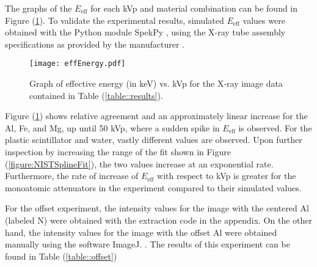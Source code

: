 \begin{table}[H]
    \small
    \noindent\makebox[\textwidth]{%
    
    }
    \caption{The results for each non-saturated (intensities not equal to 0 or 1) X-ray image for the composition experiment.}
    \label{table::results}
\end{table}



The graphs of the $E_{\text{eff}}$ for each kVp and material combination can be found in Figure (\ref{figure::results}). To validate the experimental results, simulated $E_{\text{eff}}$ values were obtained with the Python module SpekPy \cite{SpekPy}, using the X-ray tube assembly specifications as provided by the manufacturer \cite{CArm}.


\begin{figure}[H]
    \centering
    \texttt{[image: effEnergy.pdf]}
    \caption{Graph of effective energy (in keV) vs. kVp for the X-ray image data contained in Table (\ref{table::results}).}
    \label{figure::results}
\end{figure}

Figure (\ref{figure::results}) shows relative agreement and an approximately linear increase for the Al, Fe, and Mg, up until 50 kVp, where a sudden spike in $E_{\text{eff}}$ is observed. For the plastic scintillator and water, vastly different values are observed. Upon further inspection by increasing the range of the fit shown in Figure (\ref{figure:NISTSplineFit}), the two values increase at an exponential rate. Furthermore, the rate of increase of $E_{\text{eff}}$ with respect to kVp is greater for the monoatomic attenuators in the experiment compared to their simulated values.

For the offset experiment, the intensity values for the image with the centered Al (labeled N) were obtained with the extraction code in the appendix. On the other hand, the intensity values for the image with the offset Al were obtained manually using the software ImageJ. \cite{ImageJ}. The results of this experiment can be found in Table (\ref{table::offset})


\begin{table}[H]
    \small
    \noindent\makebox[\textwidth]{%
    
    }
    \caption{The results of X-ray images of a centered and offset Al (labeled N) at 40 kVp for use in the offset experiment.}
    \label{table::offset}
\end{table}

